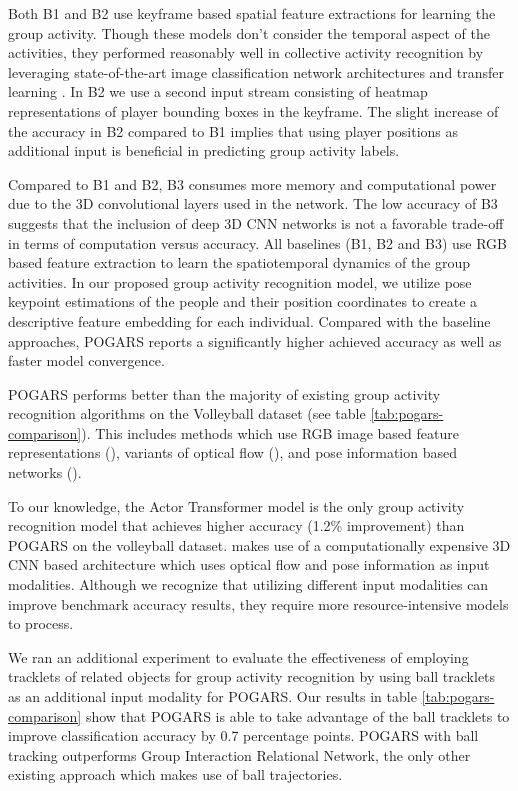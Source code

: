 \documentclass[a4paper,fleqn]{cas-dc}
\begin{document}
Both B1 and B2 use keyframe based spatial feature extractions for learning the group activity.
Though these models don't consider the temporal aspect of the activities, they performed reasonably well in collective activity recognition by leveraging state-of-the-art image classification network architectures and transfer learning \cite{Yosinski2014_transferLearning}.
In B2 we use a second input stream consisting of heatmap representations of player bounding boxes in the keyframe.
The slight increase of the accuracy in B2 compared to B1 implies that using player positions as additional input is beneficial in predicting group activity labels.

Compared to B1 and B2, B3 consumes more memory and computational power due to the 3D convolutional layers used in the network. 
The low accuracy of B3 suggests that the inclusion of deep 3D CNN networks is not a favorable trade-off in terms of computation versus accuracy. 
All baselines (B1, B2 and B3) use RGB based feature extraction to learn the spatiotemporal dynamics of the group activities. 
In our proposed group activity recognition model, we utilize pose keypoint estimations of the people and their position coordinates to create a descriptive feature embedding for each individual. 
Compared with the baseline approaches, POGARS reports a significantly higher achieved accuracy as well as faster model convergence.

POGARS performs better than the majority of existing group activity recognition algorithms on the Volleyball dataset (see table \ref{tab:pogars-comparison}). 
This includes methods which use RGB image based feature representations (\cite{Ibrahim2016_hierarchical_deep,Shu2017_CERN}), variants of optical flow (\cite{Azar2018_multistream,Azar2019_convoRelational}), and pose information based networks (\cite{Perez2020_SkeletonBased_GIRN}). 

To our knowledge, the Actor Transformer model \cite{Gavrilyuk2020_ActorTransformer} is the only group activity recognition model that achieves higher accuracy (1.2\% improvement) than POGARS on the volleyball dataset. 
\cite{Gavrilyuk2020_ActorTransformer} makes use of a computationally expensive 3D CNN based architecture which uses optical flow and pose information as input modalities.
Although we recognize that utilizing different input modalities can improve benchmark accuracy results, they require more resource-intensive models to process.

We ran an additional experiment to evaluate the effectiveness of employing tracklets of related objects for group activity recognition by using ball tracklets as an additional input modality for POGARS. 
Our results in table \ref{tab:pogars-comparison} show that POGARS is able to take advantage of the ball tracklets to improve classification accuracy by 0.7 percentage points. 
POGARS with ball tracking outperforms Group Interaction Relational Network\cite{Perez2020_SkeletonBased_GIRN}, the only other existing approach which makes use of ball trajectories.
\end{document}
